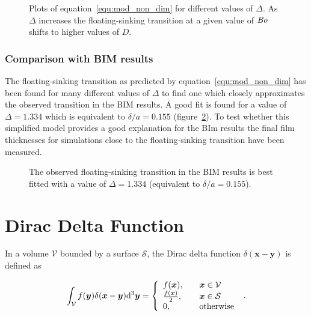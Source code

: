 \documentclass[12pt]{article}
\newcommand\Bo{\mbox{\textit{Bo}}}  %
\begin{document}
  \begin{figure}
    \resizebox{0.9\textwidth}{!}{\large }
    \caption{Plots of equation~\ref{equ:mod_non_dim} for different values of $\Delta$. As $\Delta$ increases the floating-sinking transition at a given value of $\Bo$ shifts to higher values of $D$. \label{fig:Delta_trans}}
  \end{figure}

\subsubsection{Comparison with BIM results}
\label{subsubsection:mod_comp_bim}

The floating-sinking transition as predicted by equation~\ref{equ:mod_non_dim} has been found for many different values of $\Delta$ to find one which closely approximates the observed transition in the BIM results. A good fit is found for a value of $\Delta = 1.334$ which is equivalent to $\delta / a = 0.155$ (figure~\ref{fig:static_bim_comp}). To test whether this simplified model provides a good explanation for the BIm results the final film thicknesses for simulations close to the floating-sinking transition have been measured.

  \begin{figure}
    \resizebox{0.9\textwidth}{!}{\large }
    \caption{The observed floating-sinking transition in the BIM results is best fitted with a value of $\Delta = 1.334$ (equivalent to $\delta / a = 0.155$). \label{fig:static_bim_comp}}
  \end{figure}

\appendix

\section{Dirac Delta Function}
\label{app:delta}

In a volume $\mathcal{V}$ bounded by a surface $\mathcal{S}$, the Dirac delta function $\delta(\boldsymbol{x} - \boldsymbol{y})$ is defined as \citep{Riley06}

\begin{equation}
\label{equ:dirac}
\int_{\mathcal{V}} f(\boldsymbol{y}) \delta(\boldsymbol{x} - \boldsymbol{y}) \mathrm{d}^{3} \boldsymbol{y} = \left\{
    \begin{array}{l l}
      f(\boldsymbol{x}), &\quad \boldsymbol{x} \in \mathcal{V} \\
      \frac{f(\boldsymbol{x})}{2}, &\quad \boldsymbol{x} \in \mathcal{S} \\
      0, & \quad \text{otherwise}
\end{array}
\right.\ .
\end{equation}
\end{document}

